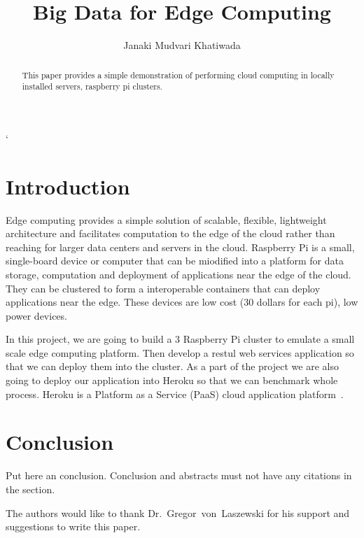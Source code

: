 
\title{Big Data for Edge Computing}



\author{Janaki Mudvari Khatiwada}


\renewcommand{\shortauthors}{J. M. Khatiwada}



\begin{abstract}
  This paper provides a simple demonstration of performing cloud computing in
  locally installed servers, raspberry pi clusters.
\end{abstract}



\maketitle`

\section{Introduction}
  Edge computing provides a simple solution of scalable, flexible, lightweight
  architecture and facilitates computation to the edge of the cloud rather than
  reaching for larger data centers and servers in the cloud. Raspberry Pi is a
  small, single-board device or computer that can be miodified into a platform
  for data
  storage, computation and deployment of applications near the edge of the cloud.
  They can
  be clustered to form a interoperable containers that can deploy applications near
  the edge. These devices are low cost (30 dollars for each pi), low power
  devices.
  
  In this project, we are going to build a 3 Raspberry Pi cluster to emulate a small
  scale edge computing platform. Then develop a
  restul web services application so that we can deploy them into the cluster.
  As a part of the
  project we are also going to deploy our application into Heroku so that we can
  benchmark whole process. Heroku is a Platform as a Service (PaaS) cloud
  application platform~\cite{www-heroku-com}.
  
\section{Conclusion}

Put here an conclusion. Conclusion and abstracts must not have any
citations in the section.


\begin{acks}

  The authors would like to thank Dr.~Gregor~von~Laszewski for his
  support and suggestions to write this paper.

\end{acks}


 
